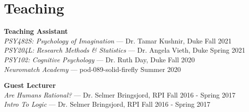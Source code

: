 \section{Teaching}
\textbf{Teaching Assistant} \\
\emph{PSY482S: Psychology of Imagination} --- Dr. Tamar Kushnir, Duke \hfill Fall 2021 \\
\emph{PSY204L: Research Methods \& Statistics} --- Dr. Angela Vieth, Duke \hfill Spring 2021 \\
\emph{PSY102: Cognitive Psychology} --- Dr. Ruth Day, Duke  \hfill Fall 2020 \\
\emph{Neuromatch Academy} --- pod-089-solid-firefly \hfill Summer 2020

\textbf{Guest Lecturer} \\
\emph{Are Humans Rational?} --- Dr. Selmer Bringsjord, RPI \hfill Fall 2016 - Spring 2017 \\
\emph{Intro To Logic} --- Dr. Selmer Bringsjord, RPI \hfill Fall 2016 - Spring 2017
